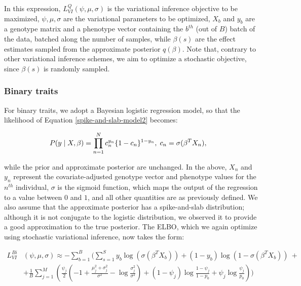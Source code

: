 In this expression, $L^{Q}_{VI}(\psi, \mu, \sigma)$ is the variational inference objective to be maximized, $\psi, \mu, \sigma$ are the variational parameters to be optimized, $X_b$ and $y_b$ are a genotype matrix and a phenotype vector containing the $b^{th}$ (out of $B$) batch of the data, batched along the number of samples, while $\beta(s)$ are the effect estimates sampled from the approximate posterior $q(\beta)$.
%
Note that, contrary to other variational inference schemes, we aim to optimize a stochastic objective, since $\beta(s)$ is randomly sampled.
%

\subsubsection{Binary traits}
%
For binary traits, we adopt a Bayesian logistic regression model, so that the likelihood of Equation \ref{spike-and-slab-model2} becomes:

\begin{align}
    P(y \mid X, \beta) &= \prod_{n=1}^{N} c_n^{y_n} \{1 - c_n\}^{1-y_n}, \hspace{1mm} c_n = \sigma(\beta^T X_n),
    \label{spike-and-slab-model3}
\end{align}

while the prior and approximate posterior are unchanged.
%
In the above, $X_n$ and $y_n$ represent the covariate-adjusted genotype vector and phenotype values for the $n^{th}$ individual, $\sigma$ is the sigmoid function, which maps the output of the regression to a value between $0$ and $1$, and all other quantities are as previously defined.
%
We also assume that the approximate posterior has a spike-and-slab distribution; although it is not conjugate to the logistic distribution, we observed it to provide a good approximation to the true posterior.
%
The ELBO, which we again optimize using stochastic variational inference, now takes the form: 
%

\begin{align}
    L^{Bi}_{VI}&(\psi, \mu, \sigma) \approx - \sum\limits^{B}_{b=1} \Bigg( \sum\limits^{S}_{s=1} y_b \log(\sigma(\beta^T X_b)) + (1-y_b)\log(1-\sigma(\beta^T X_b)) \nonumber \ + \\
    &+ \frac{1}{B}\sum\limits^{M}_{j=1} \left(  \frac{\psi_j}{2}\left(-1 + \frac{\mu_j^2 + \sigma_j^2}{\sigma^2} - \log \frac{\sigma_j^2}{\sigma^2} \right) + (1-\psi_j)\log\frac{1 - \psi_j}{1 - p_0} + \psi_j\log\frac{\psi_j}{p_0} \right) \Bigg)
\end{align}

